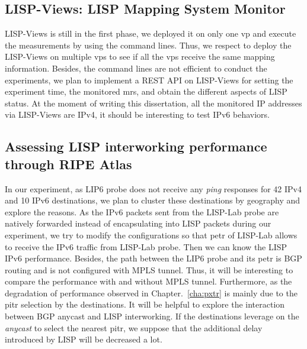 \subsection{LISP-Views: LISP Mapping System Monitor}    
LISP-Views is still in the first phase, we deployed it on only one \acrshort{vp} and execute the measurements by using the command lines. Thus, we respect to deploy the LISP-Views on multiple \acrshort{vp}s to see if all the \acrshort{vp}s receive the same mapping information. Besides, the command lines are not efficient to conduct the experiments, we plan to implement a REST API on LISP-Views for setting the experiment time, the monitored \acrshort{mr}s, and obtain the different aspects of LISP status. At the moment of writing this dissertation, all the monitored IP addresses via LISP-Views are IPv4, it should be interesting to test IPv6 behaviors. 

\subsection{Assessing LISP interworking performance through RIPE Atlas}
In our experiment, as LIP6 probe does not receive any \emph{ping} responses for 42 IPv4 and 10 IPv6 destinations, we plan to cluster these destinations by geography and explore the reasons. As the IPv6 packets sent from the LISP-Lab probe are natively forwarded instead of encapsulating into LISP packets during our experiment, we try to modify the configurations so that \acrshort{petr} of LISP-Lab allows to receive the IPv6 traffic from LISP-Lab probe. Then we can know the LISP IPv6 performance. Besides, the path between the LIP6 probe and its \acrshort{petr} is BGP routing and is not configured with MPLS tunnel. Thus, it will be interesting to compare the performance with and without MPLS tunnel. Furthermore, as the degradation of performance observed in Chapter.~\ref{cha:pxtr} is mainly due to the \acrshort{pitr} selection by the destinations. It will be helpful to explore the interaction between BGP anycast and LISP interworking. If the destinations leverage on the \emph{anycast} to select the nearest \acrshort{pitr}, we suppose that the additional delay introduced by LISP will be decreased a lot.

